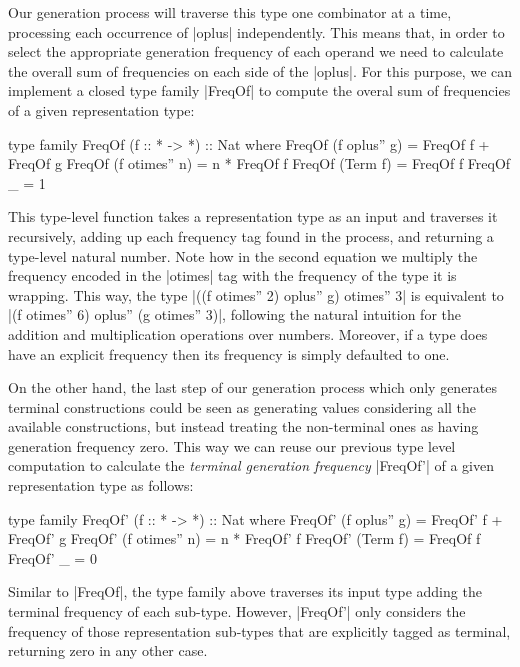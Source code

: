 Our generation process will traverse this type one combinator at a time,
processing each occurrence of |oplus| independently.
%
This means that, in order to select the appropriate generation frequency of each
operand we need to calculate the overall sum of frequencies on each side of the
|oplus|.
%
For this purpose, we can implement a closed type family |FreqOf| to compute the
overal sum of frequencies of a given representation type:

\begin{code}
type family FreqOf (f :: * -> *) :: Nat where
  FreqOf (f oplus'' g)   = FreqOf f + FreqOf g
  FreqOf (f otimes'' n)  = n * FreqOf f
  FreqOf (Term f)        = FreqOf f
  FreqOf _               = 1
\end{code}

This type-level function takes a representation type as an input and traverses
it recursively, adding up each frequency tag found in the process, and returning
a type-level natural number.
%
Note how in the second equation we multiply the frequency encoded in the
|otimes| tag with the frequency of the type it is wrapping.
%
This way, the type |((f otimes'' 2) oplus'' g) otimes'' 3| is equivalent to |(f
otimes'' 6) oplus'' (g otimes'' 3)|, following the natural intuition for the
addition and multiplication operations over numbers.
%
Moreover, if a type does have an explicit frequency then its frequency is simply
defaulted to one.


On the other hand, the last step of our generation process which only generates
terminal constructions could be seen as generating values considering all the
available constructions, but instead treating the non-terminal ones as having
generation frequency zero.
%
This way we can reuse our previous type level computation to calculate the
\emph{terminal generation frequency} |FreqOf'| of a given representation type as
follows:

\begin{code}
type family FreqOf' (f :: * -> *) :: Nat where
  FreqOf' (f oplus'' g)   = FreqOf' f  +  FreqOf' g
  FreqOf' (f otimes'' n)  = n  *  FreqOf' f
  FreqOf' (Term f)        = FreqOf f
  FreqOf' _               = 0
\end{code}

Similar to |FreqOf|, the type family above traverses its input type adding the
terminal frequency of each sub-type.
%
However, |FreqOf'| only considers the frequency of those representation
sub-types that are explicitly tagged as terminal, returning zero in any other
case.


